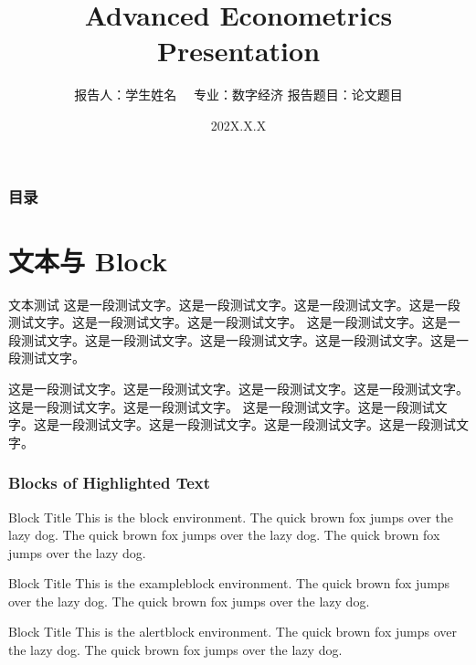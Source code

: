\documentclass[notheorems,11pt,compress]{beamer}
\title[论文题目]{Advanced Econometrics Presentation}
\author[学生姓名]
{
    报告人：学生姓名~~ \vskip 3mm
    专业：数字经济 \vskip 3mm
    报告题目：论文题目
}
\institute[学校名称]{}
\date[202X.X.X]{202X.X.X}
\numberwithin{figure}{section}
\numberwithin{table}{section}
\numberwithin{equation}{section}
\theoremstyle{plain}
\numberwithin{theorem}{section}
\numberwithin{lemma}{section}
\numberwithin{corollary}{section}
\numberwithin{definition}{section}
\numberwithin{proposition}{section}
\theoremstyle{example}
\begin{document}
\setlength{\baselineskip}{15pt}

\begin{frame}
\titlepage
\end{frame}


\begin{frame}
\frametitle{目录}
\tableofcontents
\end{frame}



\section{文本与 Block}

\begin{frame}{文本测试}
这是一段测试文字。这是一段测试文字。这是一段测试文字。这是一段测试文字。这是一段测试文字。这是一段测试文字。
这是一段测试文字。这是一段测试文字。这是一段测试文字。这是一段测试文字。这是一段测试文字。这是一段测试文字。

\vspace{1ex}
这是一段测试文字。这是一段测试文字。这是一段测试文字。这是一段测试文字。这是一段测试文字。这是一段测试文字。
这是一段测试文字。这是一段测试文字。这是一段测试文字。这是一段测试文字。这是一段测试文字。这是一段测试文字。

\end{frame}


\begin{frame}
\frametitle{Blocks of Highlighted Text}
\begin{block}{Block Title}
This is the block environment. The quick brown fox jumps over the lazy dog. The quick brown fox jumps over the lazy dog. The quick brown fox jumps over the lazy dog.
\end{block}

\begin{exampleblock}{Block Title}
This is the exampleblock environment. The quick brown fox jumps over the lazy dog. The quick brown fox jumps over the lazy dog.
\end{exampleblock}

\begin{alertblock}{Block Title}
This is the alertblock environment. The quick brown fox jumps over the lazy dog. The quick brown fox jumps over the lazy dog.
\end{alertblock}
\end{frame}
\end{document}
